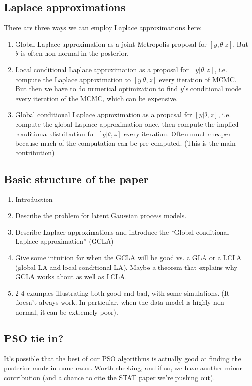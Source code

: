 \documentclass[12pt]{article}
\begin{document}
\subsection{Laplace approximations}
There are three ways we can employ Laplace approximations here:
\begin{enumerate}
\item Global Laplace approximation as a joint Metropolis proposal for $[y,\theta|z]$. But $\theta$ is often non-normal in the posterior.
\item Local conditional Laplace approximation as a proposal for $[y|\theta,z]$, i.e. compute the Laplace approximation to $[y|\theta,z]$ every iteration of MCMC. But then we have to do numerical optimization to find $y$'s conditional mode every iteration of the MCMC, which can be expensive.
\item Global conditional Laplace approximation as a proposal for $[y|\theta,z]$, i.e. compute the global Laplace approximation once, then compute the implied conditional distribution for $[y|\theta,z]$ every iteration. Often much cheaper because much of the computation can be pre-computed. (This is the main contribution)
\end{enumerate}

\subsection{Basic structure of the paper}
\begin{enumerate}
\item Introduction
\item Describe the problem for latent Gaussian process models.
\item Describe Laplace approximations and introduce the ``Global conditional Laplace approximation'' (GCLA)
\item Give some intuition for when the GCLA will be good vs. a GLA or a LCLA (global LA and local conditional LA). Maybe a theorem that explains why GCLA works about as well as LCLA.
\item 2-4 examples illustrating both good and bad, with some simulations. (It doesn't always work. In particular, when the data model is highly non-normal, it can be extremely poor).
\end{enumerate}

\subsection{PSO tie in?}
It's possible that the best of our PSO algorithms is actually good at finding the posterior mode in some cases. Worth checking, and if so, we have another minor contribution (and a chance to cite the STAT paper we're pushing out).

\clearpage\pagebreak\newpage\thispagestyle{empty}


\end{document}
